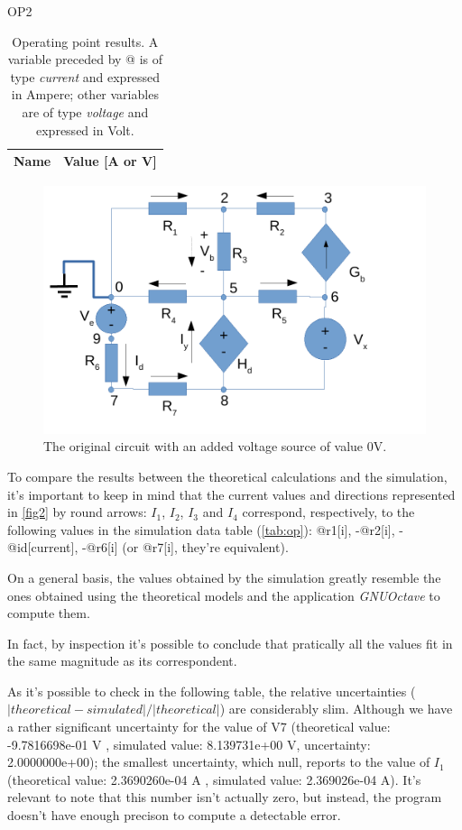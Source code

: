 OP2

\begin{table}[htb!]
  \centering
  \begin{tabular}{|l|r|}
    \hline    
    {\bf Name} & {\bf Value [A or V]} \\ \hline
    
  \end{tabular}
  \caption{Operating point results. A variable preceded by @ is of type {\em current}
    and expressed in Ampere; other variables are of type {\it voltage} and expressed in
    Volt.}
  \label{tab:op2}
\end{table}

\begin{figure}[h] \centering
\includegraphics[width=0.4\linewidth]{t2-t-2-new-0V.pdf}
\caption{The original circuit with an added voltage source of value 0V.}
\label{fig3}
\end{figure}


To compare the results between the theoretical calculations and the simulation, it's important to keep in mind that the current values and directions represented in \ref{fig2} by round arrows: $I_1$, $I_2$, $I_3$ and $I_4$ correspond, respectively, to the following values in the simulation data table (\ref{tab:op}): @r1[i], -@r2[i], -@id[current], -@r6[i] (or @r7[i], they're equivalent).


On a general basis, the values obtained by the simulation greatly resemble the ones obtained using the theoretical models and the application \textit{GNUOctave} to compute them.

In fact, by inspection it's possible to conclude that pratically all the values fit in the same magnitude as its correspondent. 

As it's possible to check in the following table, the relative uncertainties ($|theoretical - simulated|/|theoretical|$) are considerably slim.
Although we have a rather significant uncertainty for the value of V7 (theoretical value: -9.7816698e-01 V , simulated value: 8.139731e+00 V, uncertainty: 2.0000000e+00); the smallest uncertainty, which null, reports to the value of $I_1$ (theoretical value: 2.3690260e-04 A , simulated value: 2.369026e-04 A). It's relevant to note that this number isn't actually zero, but instead, the program doesn't have enough precison to compute a detectable error. 

